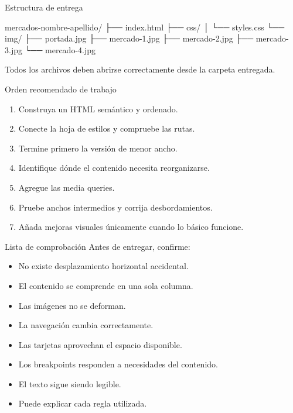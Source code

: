 \documentclass[aspectratio=169,11pt]{beamer}
\begin{document}
    \begin{frame}[fragile]{Estructura de entrega}
        \begin{bashcodedark}
            mercados-nombre-apellido/
            ├── index.html
            ├── css/
            │   └── styles.css
            └── img/
            ├── portada.jpg
            ├── mercado-1.jpg
            ├── mercado-2.jpg
            ├── mercado-3.jpg
            └── mercado-4.jpg
        \end{bashcodedark}

        Todos los archivos deben abrirse correctamente desde la carpeta entregada.
    \end{frame}

    \begin{frame}{Orden recomendado de trabajo}
        \begin{enumerate}
            \item Construya un HTML semántico y ordenado.
            \item Conecte la hoja de estilos y compruebe las rutas.
            \item Termine primero la versión de menor ancho.
            \item Identifique dónde el contenido necesita reorganizarse.
            \item Agregue las media queries.
            \item Pruebe anchos intermedios y corrija desbordamientos.
            \item Añada mejoras visuales únicamente cuando lo básico funcione.
        \end{enumerate}

    \end{frame}

    \begin{frame}{Lista de comprobación}
        Antes de entregar, confirme:

        \begin{itemize}
            \item No existe desplazamiento horizontal accidental.
            \item El contenido se comprende en una sola columna.
            \item Las imágenes no se deforman.
            \item La navegación cambia correctamente.
            \item Las tarjetas aprovechan el espacio disponible.
            \item Los breakpoints responden a necesidades del contenido.
            \item El texto sigue siendo legible.
            \item Puede explicar cada regla utilizada.
        \end{itemize}
    \end{frame}
\end{document}
